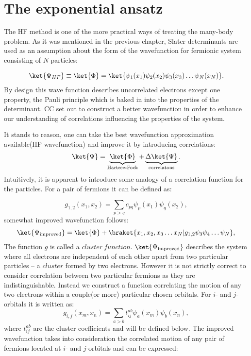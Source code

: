 \documentclass[twoside,english]{uiofysmaster}
\begin{document}
\section{The exponential ansatz}


The HF method is one of the more practical ways of treating the many-body problem. As it was mentioned in the previous chapter, Slater determinants are used as an assumption about the form of the wavefunction for fermionic system consisting of $N$ particles:

\[
\ket{\Psi_{HF}} \equiv \ket{\Phi} = \ket{\psi_1(x_1) \psi_2(x_2) \psi_3(x_3)  \dots \psi_N(x_N)}.
\]
By design this wave function describes uncorrelated electrons except one property, the Pauli principle which is baked in into the properties of the determinant. CC set out to construct a better wavefunction in order to enhance our understanding of correlations influencing the properties of the system. 

It stands to reason, one can take the best wavefunction approximation available(HF wavefunction) and improve it by introducing correlations:
\[
\ket{\Psi} =\underbrace{\ket{\Phi}}_{\text{Hartree-Fock}} + \underbrace{\Delta\ket{\Psi}}_{\text{correlatons}}.
\]
Intuitively, it is apparent to introduce some analogy of a correlation function for the particles. For a pair of fermions it can be defined as:

\[
g_{1,2}(x_1, x_2)=\sum_{p>q}c_{pq}\psi_p(x_1)\psi_q(x_2),
\]
somewhat improved wavefunction follows:
\[
\ket{\Psi_{\text{improved}}} = \ket{\Phi} + \braket{x_1, x_2, x_3 \dots x_N|g_{1,2}\psi_3\psi_4 \dots \psi_N},
\]
The function $g$ is called a $cluster\ function$. $\ket{\Psi_{\text{improved}}}$ describes the system where all electrons are independent of each other apart from two particular particles -- a $cluster$ formed by two electrons.
However it is not strictly correct to consider correlation between two particular fermions as they are indistinguishable. Instead we construct a function correlating the motion of any two electrons within a couple(or more) particular chosen orbitals. For $i$- and $j$-orbitals it is written as:
\begin{equation}\label{eq:orbclustfun}
g_{i,j}(x_m, x_n)=\sum_{a>b}t_{ij}^{ab}\psi_a(x_m)\psi_b(x_n),
\end{equation}
where $t_{ij}^{ab}$ are the cluster coefficients and will be defined below.
The improved wavefunction takes into consideration the correlated motion of any pair of fermions located at $i$- and $j$-orbitals and can be expressed:
\end{document}

